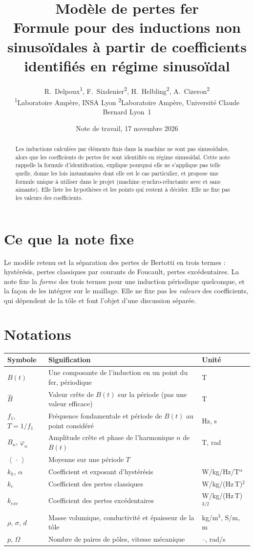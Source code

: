 \documentclass[11pt,a4paper]{article}
\title{Modèle de pertes fer\\[4pt]
\large Formule pour des inductions non sinusoïdales à partir de coefficients identifiés en régime sinusoïdal}
\author{R.~Delpoux\textsuperscript{1}, F.~Sixdenier\textsuperscript{2}, H.~Helbling\textsuperscript{2}, A.~Cizeron\textsuperscript{2}\\[6pt]
{\small \textsuperscript{1}Laboratoire Ampère, INSA Lyon \qquad \textsuperscript{2}Laboratoire Ampère, Université Claude Bernard Lyon~1}}
\date{Note de travail, 17 novembre 2026}
\newcommand{\moy}[1]{\left\langle #1 \right\rangle}
\newcommand{\Bc}{\hat{B}}
\begin{document}
\maketitle

\begin{abstract}
Les inductions calculées par éléments finis dans la machine ne sont pas sinusoïdales, alors que les coefficients de pertes fer sont identifiés en régime sinusoïdal. Cette note rappelle la formule d'identification, explique pourquoi elle ne s'applique pas telle quelle, donne les lois instantanées dont elle est le cas particulier, et propose une formule unique à utiliser dans le projet (machine synchro-réluctante avec et sans aimants). Elle liste les hypothèses et les points qui restent à décider. Elle ne fixe pas les valeurs des coefficients.
\end{abstract}

\section{Ce que la note fixe}

Le modèle retenu est la séparation des pertes de Bertotti en trois termes : hystérésis, pertes classiques par courants de Foucault, pertes excédentaires. La note fixe la \emph{forme} des trois termes pour une induction périodique quelconque, et la façon de les intégrer sur le maillage. Elle ne fixe pas les \emph{valeurs} des coefficients, qui dépendent de la tôle et font l'objet d'une discussion séparée.

\section{Notations}

\begin{center}
\begin{tabularx}{\textwidth}{@{}lXl@{}}
\toprule
Symbole & Signification & Unité \\
\midrule
$B(t)$ & Une composante de l'induction en un point du fer, périodique & T \\
$\Bc$ & Valeur crête de $B(t)$ sur la période (pas une valeur efficace) & T \\
$f_1$, $T = 1/f_1$ & Fréquence fondamentale et période de $B(t)$ au point considéré & Hz, s \\
$B_n$, $\varphi_n$ & Amplitude crête et phase de l'harmonique $n$ de $B(t)$ & T, rad \\
$\moy{\,\cdot\,}$ & Moyenne sur une période $T$ & \\
$k_h$, $\alpha$ & Coefficient et exposant d'hystérésis & W/kg/Hz/T$^{\alpha}$ \\
$k_c$ & Coefficient des pertes classiques & W/kg/(Hz\,T)$^{2}$ \\
$k_{exc}$ & Coefficient des pertes excédentaires & W/kg/(Hz\,T)$^{3/2}$ \\
$\rho$, $\sigma$, $d$ & Masse volumique, conductivité et épaisseur de la tôle & kg/m$^3$, S/m, m \\
$p$, $\Omega$ & Nombre de paires de pôles, vitesse mécanique & --, rad/s \\
\bottomrule
\end{tabularx}
\end{center}
\end{document}

